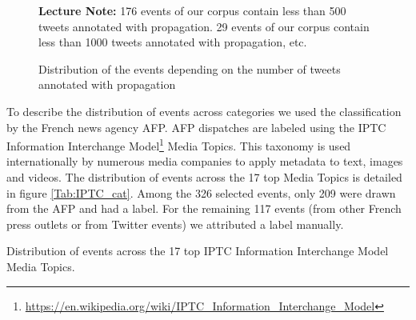 \begin{figure}
\begin{center}

\end{center}
{\scriptsize 

\textbf{Lecture Note:} 176 events of our corpus contain less than 500 tweets annotated with propagation. 29 events of our corpus contain less than 1000 tweets annotated with propagation, etc.
}
\caption{Distribution of the events depending on the number of tweets  annotated with propagation}
\label{Figure:HistogramMachineEventsByNbTweets_Related}
\end{figure}

To describe the distribution of events across categories we used the classification by the French news agency AFP. AFP dispatches are labeled using the IPTC Information Interchange Model\footnote{\url{https://en.wikipedia.org/wiki/IPTC_Information_Interchange_Model}} Media Topics. This taxonomy is used internationally by numerous media companies to apply metadata to text, images and videos. The distribution of events across the 17 top Media Topics is detailed in figure \ref{Tab:IPTC_cat}. Among the 326 selected events, only 209 were drawn from the AFP and had a label. For the remaining 117 events (from other French press outlets or from Twitter events) we attributed a label manually.

\begin{table}
\begin{center}
\makebox[\textwidth][c]{}
\end{center}
\caption{Distribution of events across the 17 top IPTC Information Interchange Model Media Topics. \label{Tab:IPTC_cat}}
\end{table}


